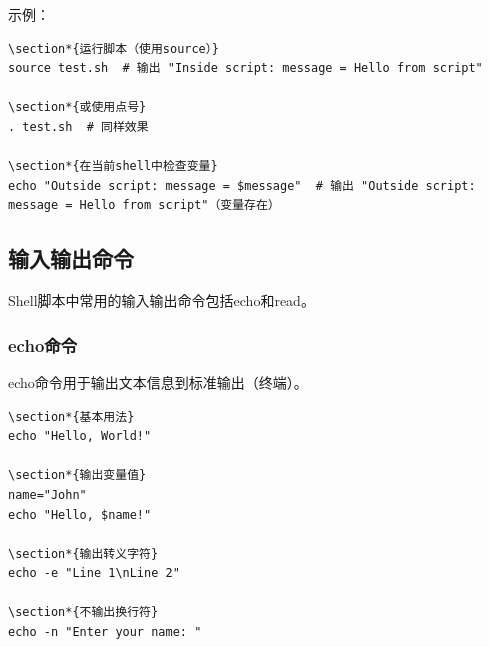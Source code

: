 \documentclass[12pt,UTF8]{ctexbook}
\begin{document}
示例：
\begin{verbatim}
\section*{运行脚本（使用source）}
source test.sh  # 输出 "Inside script: message = Hello from script"

\section*{或使用点号}
. test.sh  # 同样效果

\section*{在当前shell中检查变量}
echo "Outside script: message = $message"  # 输出 "Outside script: message = Hello from script"（变量存在）
\end{verbatim}

\subsection{输入输出命令}
Shell脚本中常用的输入输出命令包括echo和read。

\subsubsection{echo命令}
echo命令用于输出文本信息到标准输出（终端）。

\begin{verbatim}
\section*{基本用法}
echo "Hello, World!"

\section*{输出变量值}
name="John"
echo "Hello, $name!"

\section*{输出转义字符}
echo -e "Line 1\nLine 2"

\section*{不输出换行符}
echo -n "Enter your name: "
\end{verbatim}
\end{document}
